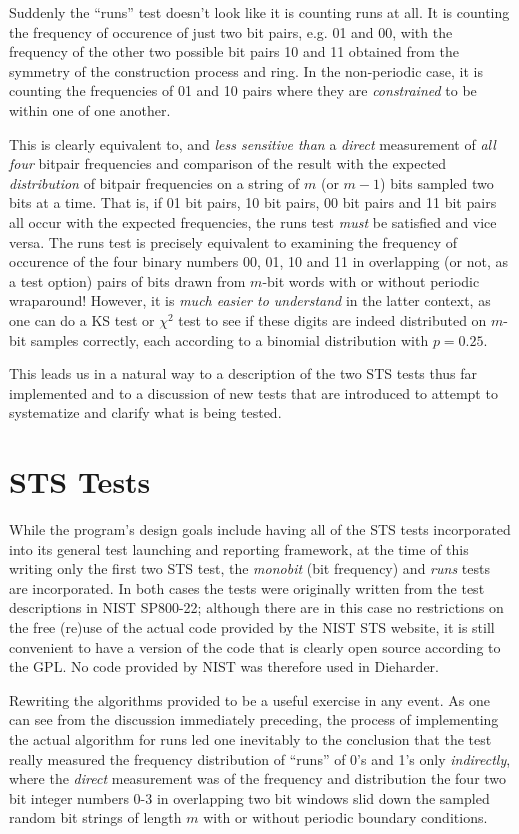 \documentclass[12pt]{book}
\begin{document}
Suddenly the ``runs'' test doesn't look like it is counting runs at all.
It is counting the frequency of occurence of just two bit pairs, e.g. 01
and 00, with the frequency of the other two possible bit pairs 10 and 11
obtained from the symmetry of the construction process and ring.  In the
non-periodic case, it is counting the frequencies of 01 and 10 pairs
where they are {\em constrained} to be within one of one another.

This is clearly equivalent to, and {\em less sensitive than} a {\em
direct} measurement of {\em all four} bitpair frequencies and comparison
of the result with the expected {\em distribution} of bitpair
frequencies on a string of $m$ (or $m-1$) bits sampled two bits at a
time.  That is, if 01 bit pairs, 10 bit pairs, 00 bit pairs and 11 bit
pairs all occur with the expected frequencies, the runs test {\em must}
be satisfied and vice versa.  The runs test is precisely equivalent to
examining the frequency of occurence of the four binary numbers 00, 01,
10 and 11 in overlapping (or not, as a test option) pairs of bits drawn
from $m$-bit words with or without periodic wraparound!  However, it is
{\em much easier to understand} in the latter context, as one can do a
KS test or $\chi^2$ test to see if these digits are indeed distributed
on $m$-bit samples correctly, each according to a binomial distribution
with $p = 0.25$.

This leads us in a natural way to a description of the two STS tests
thus far implemented and to a discussion of new tests that are
introduced to attempt to systematize and clarify what is being tested.

\section{STS Tests}

While the program's design goals include having all of the STS tests
incorporated into its general test launching and reporting framework, at
the time of this writing only the first two STS test, the {\em monobit}
(bit frequency) and {\em runs} tests are incorporated.  In both cases
the tests were originally written from the test descriptions in NIST
SP800-22; although there are in this case no restrictions on the free
(re)use of the actual code provided by the NIST STS website, it is still
convenient to have a version of the code that is clearly open source
according to the GPL.  No code provided by NIST was therefore used in
Dieharder.

Rewriting the algorithms provided to be a useful exercise in any event.
As one can see from the discussion immediately preceding, the process of
implementing the actual algorithm for runs led one inevitably to the
conclusion that the test really measured the frequency distribution of
``runs'' of 0's and 1's only {\em indirectly}, where the {\em direct}
measurement was of the frequency and distribution the four two bit
integer numbers 0-3 in overlapping two bit windows slid down the sampled
random bit strings of length $m$ with or without periodic boundary
conditions.
\end{document}
